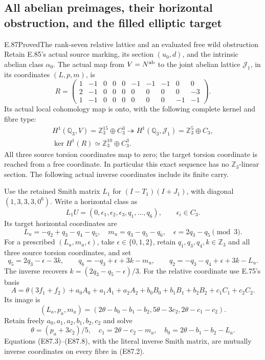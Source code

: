 \subsection{All abelian preimages, their horizontal obstruction, and the filled elliptic target}

\begin{statement}{E.87}{Proved}{The rank-seven relative lattice and an evaluated free wild obstruction}
Retain E.85's actual source marking, its section
$(u_0,d)$, and the intrinsic abelian class $\alpha_0$.
The actual map from $V=N^{\rm ab}$ to the joint
abelian lattice $\mathcal J_1$, in its coordinates
$(L,p,m)$, is
\[
 R=\begin{pmatrix}
 1&-1&0&0&0&-1&-1&-1&0&0\\
 2&-1&0&0&0&0&0&0&0&-3\\
 1&-1&0&0&0&0&0&0&-1&-1
 \end{pmatrix}.
 \tag{E87.1}
\]
Its actual local cohomology map is onto, with the
following complete kernel and fibre type:
\[
 \begin{gathered}
 H^1(\mathbb Q_3,V)=\mathbb Z_3^{15}\oplus C_3^3
   \twoheadrightarrow
 H^1(\mathbb Q_3,\mathcal J_1)=\mathbb Z_3^5\oplus C_3,\\
 \ker H^1(R)\simeq\mathbb Z_3^{10}\oplus C_3^3.
 \end{gathered}
 \tag{E87.2}
\]
All three source torsion coordinates map to zero;
the target torsion coordinate is reached from a
free coordinate. In particular this exact sequence
has no $\mathbb Z_3$-linear section. The following
actual inverse coordinates include its finite carry.

Use the retained Smith matrix $L_1$ for
$(I-T_1)(I+J_1)$, with diagonal
$(1,3,3,3,0^6)$. Write a horizontal class as
\[
 L_1U=(0,\epsilon_1,\epsilon_2,\epsilon_3,q_1,\ldots,q_6),
                     \qquad\epsilon_i\in C_3.
 \tag{E87.3}
\]
Its target horizontal coordinates are
\[
 L_u=-q_2+q_3-q_4-q_5,\quad
 m_u=q_3-q_5-q_6,\quad
 \epsilon=2q_3-q_5\pmod3.
 \tag{E87.4}
\]
For a prescribed $(L_u,m_u,\epsilon)$, take
$\epsilon\in\{0,1,2\}$, retain
$q_1,q_3,q_4,k\in\mathbb Z_3$ and all three
source torsion coordinates, and set
\[
 q_5=2q_3-\epsilon-3k,\qquad
 q_6=-q_3+\epsilon+3k-m_u,\qquad
 q_2=-q_3-q_4+\epsilon+3k-L_u.
 \tag{E87.5}
\]
The inverse recovers $k=(2q_3-q_5-\epsilon)/3$.
For the relative coordinate use E.75's basis
\[
 A=\theta(3f_1+f_2)+a_0A_0+a_1A_1+a_2A_2
             +b_0B_0+b_1B_1+b_2B_2+c_1C_1+c_2C_2.
 \tag{E87.6}
\]
Its image is
\[
  (L_a,p_a,m_a)=(2\theta-b_0-b_1-b_2,
                  5\theta-3c_2,2\theta-c_1-c_2).
 \tag{E87.7}
\]
Retain freely $a_0,a_1,a_2,b_1,b_2,c_2$ and solve
\[
 \theta=(p_a+3c_2)/5,\quad
 c_1=2\theta-c_2-m_a,\quad
 b_0=2\theta-b_1-b_2-L_a.
 \tag{E87.8}
\]
Equations (E87.3)--(E87.8), with the literal inverse
Smith matrix, are mutually inverse coordinates on
every fibre in (E87.2).


\end{statement}
